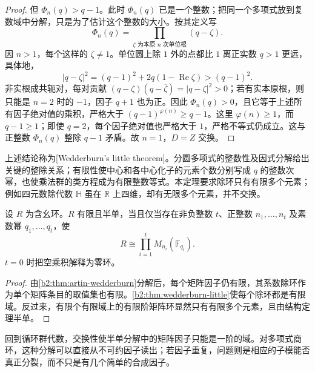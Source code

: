 \begin{proof}
	但 \(\Phi_n(q)>q-1\)。此时 \(\Phi_n(q)\) 已是一个整数；把同一个多项式放到复数域中分解，只是为了估计这个整数的大小。按其定义写
	\[
		\Phi_n(q)=\prod_{\zeta\text{ 为本原 }n\text{ 次单位根}}(q-\zeta).
	\]
	因 \(n>1\)，每个这样的 \(\zeta\ne1\)。单位圆上除 \(1\) 外的点都比 \(1\) 离正实数 \(q>1\) 更远，具体地，
	\[
		|q-\zeta|^2=(q-1)^2+2q(1-\operatorname{Re}\zeta)>(q-1)^2.
	\]
	非实根成共轭对，每对贡献 \((q-\zeta)(q-\overline\zeta)=|q-\zeta|^2>0\)；若有实本原根，则只能是 \(n=2\) 时的 \(-1\)，因子 \(q+1\) 也为正。因此 \(\Phi_n(q)>0\)，且它等于上述所有因子绝对值的乘积，严格大于 \((q-1)^{\varphi(n)}\ge q-1\)。这里 \(\varphi(n)\ge1\)，而 \(q-1\ge1\)；即使 \(q=2\)，每个因子绝对值也严格大于 \(1\)，严格不等式仍成立。这与正整数 \(\Phi_n(q)\) 整除 \(q-1\) 矛盾。故 \(n=1\)，\(D=Z\) 交换。
\end{proof}

上述结论称为[Wedderburn's little theorem]。分圆多项式的整数性及因式分解给出关键的整除关系；有限性使中心和各中心化子的元素个数分别写成 \(q\) 的整数次幂，也使乘法群的类方程成为有限整数等式。本定理要求除环只有有限多个元素；例如四元数除代数 \(\mathbb H\) 虽在 \(\mathbb R\) 上四维，却有无限多个元素，并不交换。

\begin{corollary}\label{b2:cor:finite-semisimple-rings}
	设 \(R\) 为含幺环。\(R\) 有限且半单，当且仅当存在非负整数 \(t\)、正整数 \(n_1,\ldots,n_t\) 及素数幂 \(q_1,\ldots,q_t\)，使
	\[
		R\cong\prod_{i=1}^t M_{n_i}(\mathbb F_{q_i}).
	\]
	\(t=0\) 时把空乘积解释为零环。
\end{corollary}
\begin{proof}
	由\cref{b2:thm:artin-wedderburn}分解后，每个矩阵因子仍有限，其系数除环作为单个矩阵条目的取值集也有限。\cref{b2:thm:wedderburn-little}使每个除环都是有限域。反过来，有限个有限域上的有限阶矩阵环显然只有有限多个元素，且由结构定理半单。
\end{proof}

回到循环群代数，交换性使半单分解中的矩阵因子只能是一阶的域。对多项式商环，这种分解可以直接从不可约因子读出；若因子重复，问题则是相应的子模能否真正分裂，而不只是有几个简单的合成因子。

